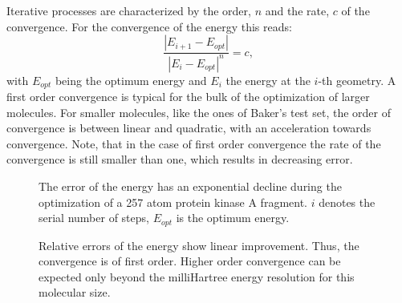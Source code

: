 \documentclass[prl,aps,twocolumn,showpacs,twocolumngrid,superbib]{revtex4}
\begin{document}
Iterative processes are characterized by the order, $n$
and the rate, $c$ of the convergence. For the convergence of the
energy this reads:
\begin{equation}
\frac{|E_{i+1}-E_{opt}|}{|E_{i}-E_{opt}|^n}=c ,
\end{equation}
with $E_{opt}$ being the optimum energy and $E_{i}$ the energy
at the $i$-th geometry.
A first order convergence is typical for the bulk of the optimization
of larger molecules. For smaller molecules, like the ones of Baker's
test set, the order of convergence is between linear and quadratic,
with an acceleration towards convergence. Note, that in the case
of first order convergence the rate of the convergence is still
smaller than one, which results in decreasing error.
\begin{figure}[h]
\caption{
\small  
The error of the energy has an exponential decline during
the optimization of a 257 atom protein kinase A fragment. 
$i$ denotes the serial number of steps,
$E_{opt}$ is the optimum energy.
\label{logn-logde}
}
\end{figure}
%
%
%
%
\begin{figure}[h]
\caption{
\small  
Relative errors of the energy show linear improvement.
Thus, the convergence is of first order. Higher order
convergence can be expected only beyond the milliHartree
energy resolution for this molecular size.
\label{order-of-conv}
}
\end{figure}
\end{document}
